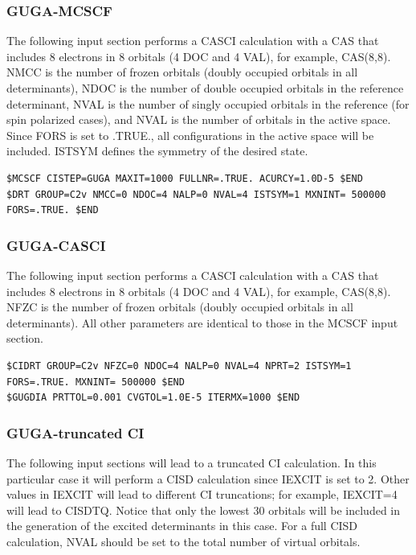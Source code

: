 {\subsubsection{GUGA-MCSCF}
The following input section performs a CASCI calculation with a CAS that includes 8
electrons in 8 orbitals (4 DOC and 4 VAL), for example, CAS(8,8). NMCC is the number of frozen
orbitals (doubly occupied orbitals in all determinants), NDOC is the number of double
occupied orbitals in the reference determinant, NVAL is the number of singly occupied
orbitals in the reference (for spin polarized cases), and NVAL is the number of orbitals in
the active space. Since FORS is set to .TRUE., all configurations in the active space will
be included. ISTSYM defines the symmetry of the desired state.

\begin{lstlisting}[style=GAMESS]
$MCSCF CISTEP=GUGA MAXIT=1000 FULLNR=.TRUE. ACURCY=1.0D-5 $END
$DRT GROUP=C2v NMCC=0 NDOC=4 NALP=0 NVAL=4 ISTSYM=1 MXNINT= 500000 FORS=.TRUE. $END
\end{lstlisting}

\subsubsection{GUGA-CASCI}
The following input section performs a CASCI calculation with a CAS that includes 8
electrons in 8 orbitals (4 DOC and 4 VAL), for example, CAS(8,8). NFZC is the number of frozen
orbitals (doubly occupied orbitals in all determinants). All other parameters are identical
to those in the MCSCF input section.

\begin{lstlisting}[style=GAMESS]
$CIDRT GROUP=C2v NFZC=0 NDOC=4 NALP=0 NVAL=4 NPRT=2 ISTSYM=1 FORS=.TRUE. MXNINT= 500000 $END
$GUGDIA PRTTOL=0.001 CVGTOL=1.0E-5 ITERMX=1000 $END
\end{lstlisting}

\subsubsection{GUGA-truncated CI}
The following input sections will lead to a truncated CI calculation. In this particular case
it will perform a CISD calculation since IEXCIT is set to 2. Other values in IEXCIT will lead
to different CI truncations; for example, IEXCIT=4 will lead to CISDTQ. Notice that only
the lowest 30 orbitals will be included in the generation of the excited determinants in this
case. For a full CISD calculation, NVAL should be set to the total number of virtual orbitals.

}
